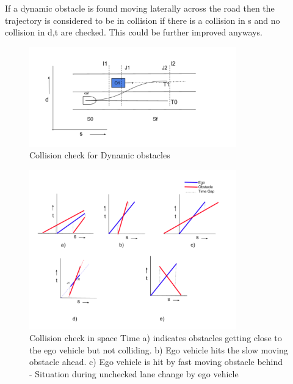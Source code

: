 If a dynamic obstacle is found moving laterally across the road then the trajectory is considered to be in collision if there is a collision in s and no collision in d,t are checked. This could be further improved anyways.  




 \begin{figure}[H]
    \centering
    \includegraphics[width=0.8\textwidth]{Images/dynamic_check.png}
    \caption{Collision check for Dynamic obstacles}
    \label{dynamic_check}
\end{figure}



\begin{figure}[h]
    \centering
    \includegraphics[width=0.8\textwidth]{Images/dynamic_Check_time.png}
    \caption{Collision check in space Time a) indicates obstacles getting close to the ego vehicle but not colliding. b) Ego vehicle hits the slow moving obstacle ahead. c) Ego vehicle is hit by fast moving obstacle behind - Situation during unchecked lane change by ego vehicle }
    \label{dynamic_time_check}
\end{figure}



